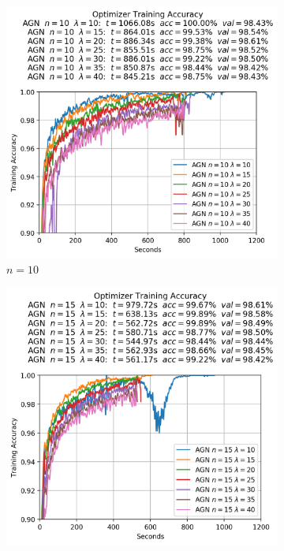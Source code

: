 \begin{figure}
  \centering
  \begin{subfigure}{.3\textwidth}
    \centering
    \includegraphics[width=\linewidth]{resources/images/agn_experiments_workers_10}
    \caption{$n = 10$}
  \end{subfigure}
  \begin{subfigure}{.3\textwidth}
    \centering
    \includegraphics[width=\linewidth]{resources/images/agn_experiments_workers_15}

\end{subfigure}
\end{figure}
